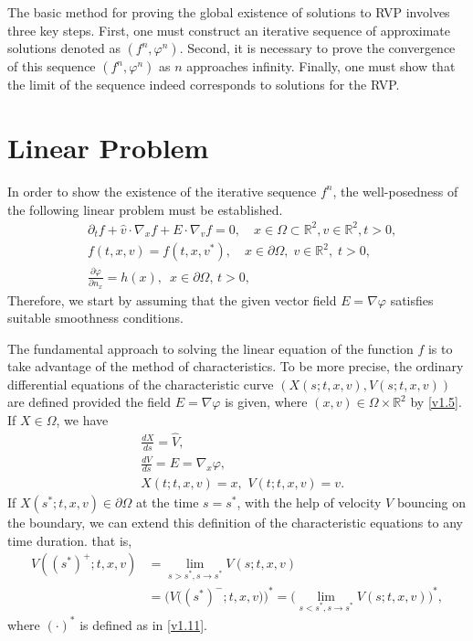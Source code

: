 \documentclass[11pt,reqno]{amsart}%
\theoremstyle{definition}
\theoremstyle{remark}
\begin{document}
The basic method for proving the global existence of solutions to RVP involves three key steps. 
First, one must construct an iterative sequence of approximate solutions denoted as $(f^{n},\varphi^{n})$. 
Second, it is necessary to prove the convergence of this sequence $(f^{n},\varphi^{n})$ as $n$ approaches infinity. 
Finally, one must show that the limit of the sequence indeed corresponds to solutions for the RVP.


\bigskip

\section{Linear Problem}

In order to show  the existence of the  iterative  sequence $f^{n}$,
 the well-posedness of the following linear problem %
 must be established.
 \begin{align}
&\partial_t f+\hat{v}\cdot\nabla_{x}f+ E\cdot\nabla_{v}f=0, \quad x\in \Omega\subset \mathbb{R}^{2}, v\in \mathbb{R}^{2},t>0, 
\label{vx3.1} \\
&f(t,x,v)=f(t,x,v^{*}),\quad x\in \partial\Omega, \; v\in \mathbb{R}^{2},\; t>0, \label{vx3.2} \\
 &\frac{\partial \varphi}{\partial n_{x}}=h(x),\,\,\, x\in \partial \Omega,\,t>0,
\label{vx3.3} 
\end{align}
Therefore,  we start by assuming that the given vector field $E=\nabla \varphi$
 satisfies suitable smoothness conditions.

The fundamental approach to solving the linear equation of the function $f$ is to take advantage of the method of characteristics.
To be more precise, the ordinary differential equations of the characteristic curve  $(X (s;t, x, v), V (s;t, x, v))$ are defined provided the   field $E=\nabla\varphi$ is given,
where $(x, v)\in \Omega\times\mathbb{R}^{2} $ by \eqref{v1.5}.
%
If $X\in\Omega$, we have
\begin{align}
&\frac{d X}{d s} = \hat{V}, \label{v4.1}\\
&\frac{d V}{d s}=E=\nabla_{x} \varphi, \label{v4.2}\\
&X(t;t, x, v)=x,\,\, V(t;t, x, v)=v.\label{v4.3}
\end{align}
%
If $X(s^{*};t,x,v)\in \partial\Omega$ at the time $s=s^{*}$,  with the help of velocity $V$ bouncing on the boundary, we can extend this definition of the characteristic equations to any time duration. that is,
\begin{align}
V((s^{*})^{+};t,x,v)&=\lim_{s>s^{*},s\rightarrow s^{*}}V(s;t,x,v) \nonumber\\
&=\Big(V\big((s^{*})^{-};t,x,v\big)\Big)^{*}=\Big(\lim_{s<s^{*},s\rightarrow s^{*}}V(s;t,x,v)\Big)^{*}, \label{v4.4}
\end{align}
where $(\cdot)^{*}$ is defined as in \eqref{v1.11}.
\end{document}
